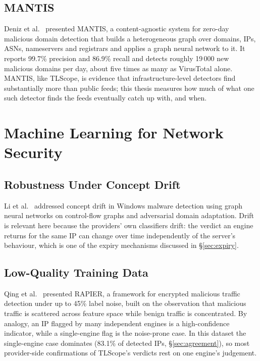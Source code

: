 \subsection{MANTIS}

Deniz et al.\ \cite{deniz2025mantis} presented MANTIS, a content-agnostic system for zero-day
malicious domain detection that builds a heterogeneous graph over domains, IPs, ASNs, nameservers
and registrars and applies a graph neural network to it. It reports 99.7\% precision and 86.9\%
recall and detects roughly 19\,000 new malicious domains per day, about five times as many as
VirusTotal alone. MANTIS, like TLScope, is evidence that infrastructure-level detectors find
substantially more than public feeds; this thesis measures how much of what one such detector finds
the feeds eventually catch up with, and when.

\section{Machine Learning for Network Security}

\subsection{Robustness Under Concept Drift}

Li et al.\ \cite{li2025conceptdrift} addressed concept drift in Windows malware detection using graph
neural networks on control-flow graphs and adversarial domain adaptation. Drift is relevant here
because the providers' own classifiers drift: the verdict an engine returns for the same IP can
change over time independently of the server's behaviour, which is one of the expiry mechanisms
discussed in \S\ref{sec:expiry}.

\subsection{Low-Quality Training Data}

Qing et al.\ \cite{qing2024rapier} presented RAPIER, a framework for encrypted malicious traffic
detection under up to 45\% label noise, built on the observation that malicious traffic is scattered
across feature space while benign traffic is concentrated. By analogy, an IP flagged by many
independent engines is a high-confidence indicator, while a single-engine flag is the noise-prone
case. In this dataset the single-engine case dominates (83.1\% of detected IPs,
\S\ref{sec:agreement}), so most provider-side confirmations of TLScope's verdicts rest on one
engine's judgement.

